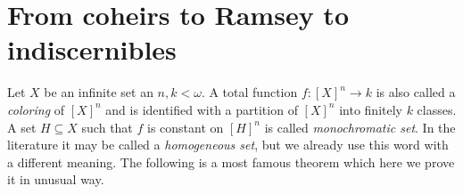 \documentclass[creche.tex]{subfiles}
\begin{document}


% 



% 



\section{From coheirs to Ramsey to indiscernibles}
\label{Ramsey}

\def\medrel#1{\parbox[t]{6ex}{$\displaystyle\hfil #1$}}
\def\ceq#1#2#3{\parbox[t]{9ex}{$\displaystyle #1$}\medrel{#2}{$\displaystyle #3$}}


Let $X$ be an infinite set an $n,k<\omega$. A total function $f:[X]^n\to k$ is also called a \emph{coloring\/} of $[X]^n$ and is identified with a partition of $[X]^n$ into finitely $k$ classes. A set $H\subseteq X$ such that $f$ is constant on $[H]^n$ is called \emph{monochromatic set}. In the literature it may be called a \emph{homogeneous set}, but we already use this word with a different meaning. The following is a most famous theorem which here we prove it in unusual way.
\end{document}
